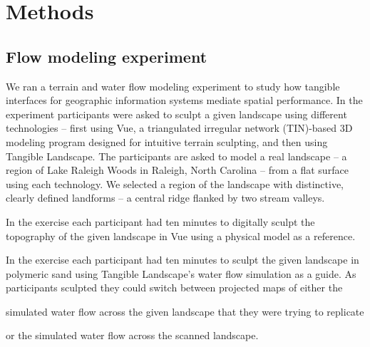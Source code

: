\documentclass{isprs}
\begin{document}
\section{Methods}\label{sec:methods}




\subsection{Flow modeling experiment}


We ran a terrain and water flow modeling experiment to study how tangible interfaces for geographic information systems mediate spatial performance. 
%
In the experiment participants were asked to sculpt a given landscape using different technologies -- 
first using Vue, a triangulated irregular network (TIN)-based 3D modeling program designed for intuitive terrain sculpting, 
and then using Tangible Landscape. 
%
The participants are asked to model a real landscape --
a region of Lake Raleigh Woods 
in Raleigh, North Carolina  -- 
from a flat surface using each technology. 
We selected a region of the landscape with distinctive, 
clearly defined landforms -- a central ridge flanked by two stream valleys. 




In the  exercise 
each participant had ten minutes to digitally sculpt the topography of the given landscape in Vue
using a physical model as a reference. 

In the  exercise each participant had ten minutes to  
sculpt the given landscape in polymeric sand
using Tangible Landscape's water flow simulation
as a guide. 
%
As participants sculpted they could switch between projected maps of either the
\begin{enumerate*}%
\item simulated water flow across the given landscape that they were trying to replicate
\item or the simulated water flow across the scanned landscape.
\end{enumerate*}
\end{document}
